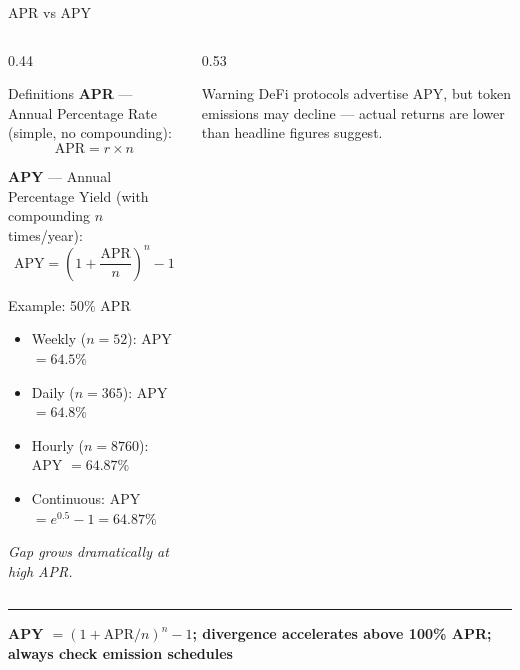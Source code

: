 \documentclass[8pt,aspectratio=169]{beamer}
\newcommand{\bottomnote}[1]{\vfill\vspace{-2mm}\textcolor{mllavender2}{\rule{\textwidth}{0.4pt}}\vspace{1mm}\footnotesize\textbf{#1}}
\begin{document}
\begin{frame}{APR vs APY}
  \begin{columns}[T]
    \begin{column}{0.44\textwidth}
      \begin{block}{Definitions}
        \textbf{APR} --- Annual Percentage Rate (simple, no compounding):
        \[ \text{APR} = r \times n \]

        \textbf{APY} --- Annual Percentage Yield (with compounding $n$ times/year):
        \[
          \text{APY} = \left(1 + \frac{\text{APR}}{n}\right)^{n} - 1
        \]
      \end{block}
      \begin{block}{Example: 50\% APR}
        \begin{itemize}\setlength\itemsep{2pt}
          \item Weekly ($n=52$): APY $= 64.5\%$
          \item Daily ($n=365$): APY $= 64.8\%$
          \item Hourly ($n=8760$): APY $= 64.87\%$
          \item Continuous: APY $= e^{0.5}-1 = 64.87\%$
        \end{itemize}
        \textit{Gap grows dramatically at high APR.}
      \end{block}
    \end{column}
    \begin{column}{0.53\textwidth}
      \begin{center}
      \end{center}
      \begin{alertblock}{Warning}
        DeFi protocols advertise APY, but token emissions may decline --- actual returns
        are lower than headline figures suggest.
      \end{alertblock}
    \end{column}
  \end{columns}
  \bottomnote{APY $=(1+\text{APR}/n)^n -1$; divergence accelerates above 100\% APR; always check emission schedules}
\end{frame}
\end{document}
